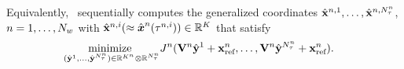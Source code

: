 	Equivalently, \methodAcronym\ sequentially computes the generalized
	coordinates
	$\hat{\mathbf{x}}^{n,1},\ldots,\hat{\mathbf{x}}^{n,N_{\tau}^{n}}$,
	$n=1,\ldots,N_w$ 
with $\hat{\mathbf{x}}^{n,i}(\approx
	\hat{ \boldsymbol x}^{n}(\tau^{n,i}))\in\mathbb{R}^{K}$
	that satisfy
\begin{equation}\label{eq:obj_gen_lms_final}
\begin{split}
	&
	\underset{(\hat{\mathbf{y}}^{1},\ldots,\hat{\mathbf{y}}^{N_{\tau}^{n}})\in\mathbb{R}^{K^{n}}\otimes \mathbb{R}^{N_{\tau}^{n}}}{\text{minimize } }
J_{}^{n} (\mathbf {V}^{n} \hat{\mathbf{y}}^{1} + \mathbf{x}_\text{ref}^{n},\ldots,\mathbf {V}^{n} \hat{\mathbf{y}}^{N_{\tau}^{n}} + \mathbf{x}_\text{ref}^{n}). 
\end{split}
\end{equation}
